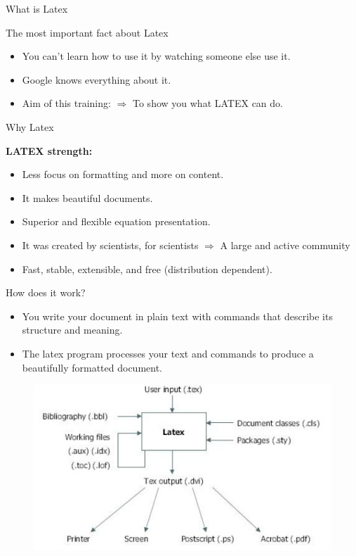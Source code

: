 \documentclass{beamer}
\begin{document}
\begin{darkframes}
   \begin{frame}[<+->]{What is Latex}
   	
   	\begin{block}{The most important fact about Latex}
   		\begin{itemize}
   			\item You can’t learn how to use it by watching someone else use it.
   			\item Google knows everything about it.
   			\item Aim of this training: $\Rightarrow$ To show you what LATEX can do.
   		\end{itemize}
   	\end{block}
   \end{frame}
   
   
   \begin{frame}[<+->]{Why Latex}
   	
   	\begin{block}{\textbf {LATEX strength:}}
   		\begin{itemize}
   			\item Less focus on formatting and more on content.
   			\item It makes beautiful documents.
   			\item Superior and flexible equation presentation.
   			\item It was created by scientists, for scientists $\Rightarrow$ A large and active community
   			\item Fast, stable, extensible, and free (distribution dependent).
   		\end{itemize}
   	\end{block}
   \end{frame}
   
   \begin{frame}[<+->]{How does it work?}
   	
   	
   	\begin{itemize}
   		\item You write your document in plain text with commands that describe its structure and meaning.
   		\item  The latex program processes your text and commands to produce a beautifully formatted document.
   	\end{itemize}
   	\pause
   	\begin{figure}
   		\includegraphics[scale=0.45]{images/latexhow}
   	\end{figure}
   \end{frame}
   

\end{darkframes}
\end{document}
